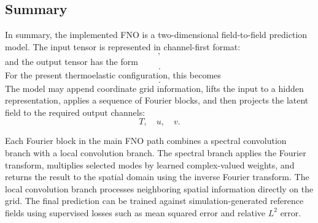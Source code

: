 \subsection{Summary}

In summary, the implemented FNO is a two-dimensional field-to-field prediction model. The input tensor is represented in channel-first format:
\begin{equation}
[B, C_{in}, N_x, N_y],
\end{equation}
and the output tensor has the form
\begin{equation}
[B, C_{out}, N_x, N_y].
\end{equation}
For the present thermoelastic configuration, this becomes
\begin{equation}
[B, 3, N_x, N_y].
\end{equation}
The model may append coordinate grid information, lifts the input to a hidden representation, applies a sequence of Fourier blocks, and then projects the latent field to the required output channels:
\begin{equation}
T, \quad u, \quad v.
\end{equation}

Each Fourier block in the main FNO path combines a spectral convolution branch with a local convolution branch. The spectral branch applies the Fourier transform, multiplies selected modes by learned complex-valued weights, and returns the result to the spatial domain using the inverse Fourier transform. The local convolution branch processes neighboring spatial information directly on the grid. The final prediction can be trained against simulation-generated reference fields using supervised losses such as mean squared error and relative \(L^2\) error.